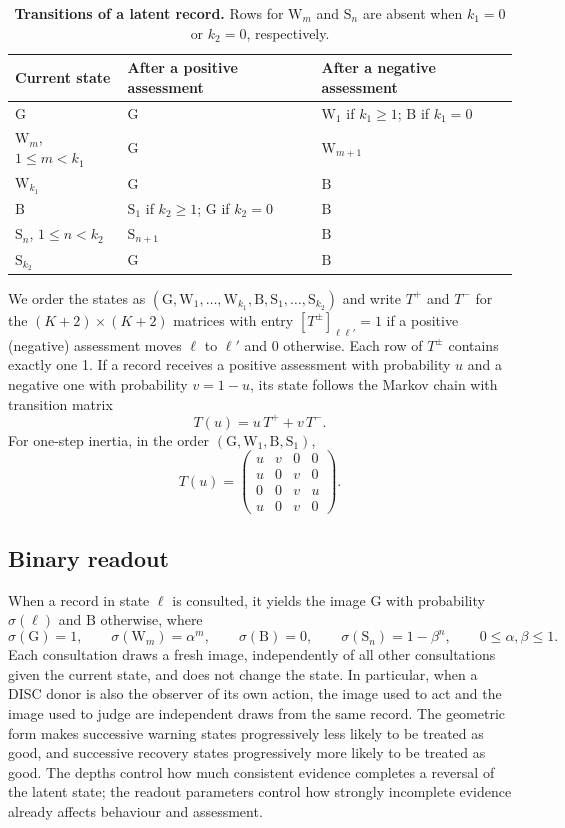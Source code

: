 \documentclass[fleqn,10pt]{article}
\theoremstyle{plain}
\theoremstyle{remark}
\newcommand{\G}{\mathrm G}
\newcommand{\B}{\mathrm B}
\newcommand{\W}{\mathrm W}
\renewcommand{\S}{\mathrm S}
\begin{document}
\begin{table}[htbp]
\centering\small
\caption{\textbf{Transitions of a latent record.} Rows for $\W_m$ and $\S_n$ are absent when $k_1=0$ or $k_2=0$, respectively.}
\label{tab:transitions}
\begin{tabular}{@{}lll@{}}
\toprule
Current state & After a positive assessment & After a negative assessment\\
\midrule
$\G$ & $\G$ & $\W_1$ if $k_1\ge1$; $\B$ if $k_1=0$\\
$\W_m$, $1\le m<k_1$ & $\G$ & $\W_{m+1}$\\
$\W_{k_1}$ & $\G$ & $\B$\\
$\B$ & $\S_1$ if $k_2\ge1$; $\G$ if $k_2=0$ & $\B$\\
$\S_n$, $1\le n<k_2$ & $\S_{n+1}$ & $\B$\\
$\S_{k_2}$ & $\G$ & $\B$\\
\bottomrule
\end{tabular}
\end{table}

We order the states as $(\G,\W_1,\dots,\W_{k_1},\B,\S_1,\dots,\S_{k_2})$ and
write $T^{+}$ and $T^{-}$ for the $(K+2)\times(K+2)$ matrices with entry
$[T^\pm]_{\ell\ell'}=1$ if a positive (negative) assessment moves $\ell$ to
$\ell'$ and $0$ otherwise. Each row of $T^\pm$ contains exactly one 1. If a record
receives a positive assessment with probability $u$ and a negative one with
probability $v=1-u$, its state follows the Markov chain with transition matrix
\begin{equation}
T(u)=u\,T^{+}+v\,T^{-}.
\label{eq:S-T}
\end{equation}
For one-step inertia, in the order $(\G,\W_1,\B,\S_1)$,
\[
T(u)=\begin{pmatrix}u&v&0&0\\u&0&v&0\\0&0&v&u\\u&0&v&0\end{pmatrix}.
\]

\subsection{Binary readout}
When a record in state $\ell$ is consulted, it yields the image $\G$ with
probability $\sigma(\ell)$ and $\B$ otherwise, where
\begin{equation}
\sigma(\G)=1,\qquad\sigma(\W_m)=\alpha^m,\qquad\sigma(\B)=0,\qquad
\sigma(\S_n)=1-\beta^n,\qquad 0\le\alpha,\beta\le1 .
\label{eq:S-readout}
\end{equation}
Each consultation draws a fresh image, independently of all other
consultations given the current state, and does not change the state. In
particular, when a DISC donor is also the observer of its own action, the image
used to act and the image used to judge are independent draws from the same
record. The geometric form makes successive warning states progressively less
likely to be treated as good, and successive recovery states progressively more
likely to be treated as good. The depths control how much consistent evidence
completes a reversal of the latent state; the readout parameters control how
strongly incomplete evidence already affects behaviour and assessment.
\end{document}
